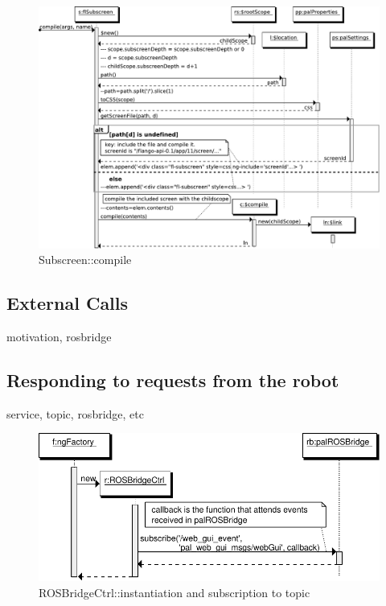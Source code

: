 \begin{figure}
    \centering
    \includegraphics{figures/design/seqdia/subscreen-compile.pdf}
    \caption{Subscreen::compile}
    \label{fig:design-seqdia-subscreen-compile}
\end{figure}

\FloatBarrier

\subsection{External Calls}
motivation, rosbridge

\subsection{Responding to requests from the robot}
service, topic, rosbridge, etc

\begin{figure}[htb]
    \centering
    \includegraphics{figures/design/seqdia/ROSBridgeCtrl-creation.pdf}
    \caption{ROSBridgeCtrl::instantiation and subscription to topic}
    \label{fig:design-seqdia-ROSBridgeCtrl-creation}
\end{figure}

